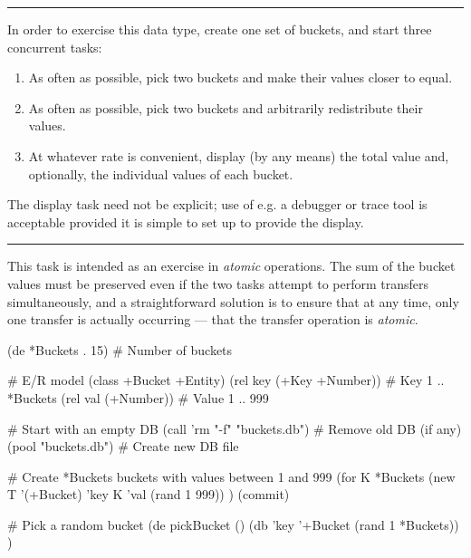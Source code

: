 \begin{center}\rule{3in}{0.4pt}\end{center}

In order to exercise this data type, create one set of buckets, and
start three concurrent tasks:

\begin{enumerate}
\item
  As often as possible, pick two buckets and make their values closer to
  equal.
\item
  As often as possible, pick two buckets and arbitrarily redistribute
  their values.
\item
  At whatever rate is convenient, display (by any means) the total value
  and, optionally, the individual values of each bucket.
\end{enumerate}

The display task need not be explicit; use of e.g. a debugger or trace
tool is acceptable provided it is simple to set up to provide the
display.

\begin{center}\rule{3in}{0.4pt}\end{center}

This task is intended as an exercise in \emph{atomic} operations. The
sum of the bucket values must be preserved even if the two tasks attempt
to perform transfers simultaneously, and a straightforward solution is
to ensure that at any time, only one transfer is actually occurring ---
that the transfer operation is \emph{atomic}.


\begin{wideverbatim}

(de *Buckets . 15)  # Number of buckets

# E/R model
(class +Bucket +Entity)
(rel key (+Key +Number))  # Key  1 .. *Buckets
(rel val (+Number))       # Value 1 .. 999


# Start with an empty DB
(call 'rm "-f" "buckets.db")  # Remove old DB (if any)
(pool "buckets.db")           # Create new DB file


# Create *Buckets buckets with values between 1 and 999
(for K *Buckets
   (new T '(+Bucket)  'key K  'val (rand 1 999)) )
(commit)


# Pick a random bucket
(de pickBucket ()
   (db 'key '+Bucket (rand 1 *Buckets)) )


\end{wideverbatim}

